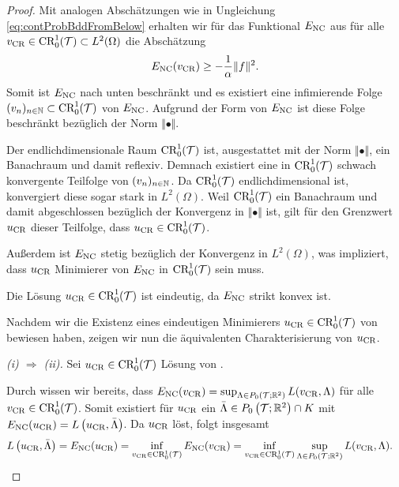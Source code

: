 \begin{proof} 
  Mit analogen Abschätzungen wie in Ungleichung \eqref{eq:contProbBddFromBelow}
  erhalten wir für das Funktional $E_\textup{NC}$ aus  
  für alle $v_\textup{CR}\in\textup{CR}^1_0(\mathcal{T})\subset L^2(\Omega)$ die Abschätzung 
  \begin{equation*}
    E_\textup{NC}(v_\textup{CR}) \geq -\frac{1}{\alpha}\Vert f\Vert^2.
  \end{equation*}
  Somit ist $E_\textup{NC}$ nach unten beschränkt und es existiert eine infimierende
  Folge $(v_n)_{n\in\mathbb{N}} \subset \textup{CR}^1_0(\mathcal{T})$ von $E_\textup{NC}$. 
  Aufgrund der Form von $E_\textup{NC}$ ist diese Folge beschränkt bezüglich der Norm
  $\Vert\bullet\Vert$. 

  Der endlichdimensionale Raum $\textup{CR}^1_0(\mathcal{T})$ ist, ausgestattet mit der Norm
  $\Vert\bullet\Vert$, ein Banachraum und damit reflexiv. 
  Demnach existiert eine in $\textup{CR}^1_0(\mathcal{T})$ schwach konvergente Teilfolge von
  $(v_n)_{n\in\mathbb{N}}$.
  Da $\textup{CR}^1_0(\mathcal{T})$ endlichdimensional ist, konvergiert diese sogar stark
  in $L^2(\Omega)$. 
  Weil $\textup{CR}^1_0(\mathcal{T})$ ein Banachraum und damit abgeschlossen bezüglich der
  Konvergenz in $\Vert\bullet\Vert$ ist, gilt für den Grenzwert $u_\textup{CR}$ dieser
  Teilfolge, dass $u_\textup{CR}\in\textup{CR}^1_0(\mathcal{T})$.

  Außerdem ist $E_\textup{NC}$ stetig bezüglich der Konvergenz in $L^2(\Omega)$,
  was impliziert, dass $u_\textup{CR}$ Minimierer von $E_\textup{NC}$ in $\textup{CR}^1_0(\mathcal{T})$ sein
  muss. 

  Die Lösung $u_\textup{CR}\in \textup{CR}^1_0(\mathcal{T})$ ist eindeutig, da $E_\textup{NC}$ strikt konvex
  ist.

  Nachdem wir die Existenz eines eindeutigen Minimierers
  $u_\textup{CR}\in\textup{CR}^1_0(\mathcal{T})$ von  bewiesen haben,
  zeigen wir nun die äquivalenten Charakterisierung von $u_\textup{CR}$.

  \textit{(i) $\Rightarrow$ (ii).}
  Sei $u_\textup{CR}\in\textup{CR}^1_0(\mathcal{T})$ Lösung von .

  Durch  wissen wir bereits,
  dass $E_\textup{NC}(v_\textup{CR}) = \sup_{\Lambda\in
  P_0\left(\mathcal{T};\mathbb{R}^2\right)}L(v_\textup{CR},\Lambda)$ für alle
  $v_\textup{CR}\in\textup{CR}^1_0(\mathcal{T})$.
  Somit existiert für $u_\textup{CR}$ ein $\bar\Lambda\in
  P_0\left(\mathcal{T};\mathbb{R}^2\right)\cap K$ mit $E_\textup{NC}(u_\textup{CR}) =
  L\left(u_\textup{CR},\bar\Lambda\right)$. 
  Da $u_\textup{CR}$  löst, folgt insgesamt
  \begin{align*}
    L\left(u_\textup{CR},\bar\Lambda\right)
    &=
    E_\textup{NC}(u_\textup{CR})
    =
    \inf_{v_\textup{CR}\in\textup{CR}^1_0(\mathcal{T})}E_\textup{NC}(v_\textup{CR})
    =
    \inf_{v_\textup{CR}\in\textup{CR}^1_0(\mathcal{T})}\sup_{\Lambda\in P_0\left(\mathcal{T};\mathbb{R}^2\right)} 
    L(v_\textup{CR},\Lambda).
  \end{align*}


\end{proof}
